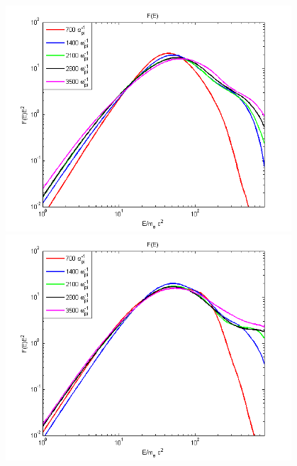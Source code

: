 \documentclass[a4paper]{jpconf}
\begin{document}
\begin{figure}[h!]
	\centering
	\begin{minipage}{0.49\textwidth}
		\centering
		\includegraphics[width=0.95\textwidth]{fig/spectrump20.png} 
	\end{minipage}\hfill
	\begin{minipage}{0.49\textwidth}
		\centering
		\includegraphics[width=0.95\textwidth]{fig/spectrump30.png} 
	\end{minipage}
	\begin{minipage}{0.49\textwidth}
		\centering

\end{minipage}
\end{figure}
\end{document}
